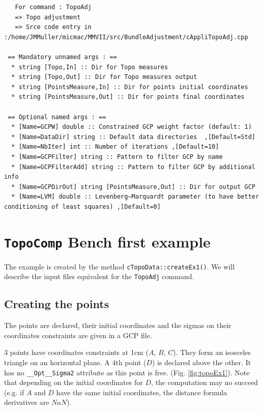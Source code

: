 \begin{verbatim}
   For command : TopoAdj 
   => Topo adjustment
   => Srce code entry in :/home/JMMuller/micmac/MMVII/src/BundleAdjustment/cAppliTopoAdj.cpp

 == Mandatory unnamed args : ==
  * string [Topo,In] :: Dir for Topo measures
  * string [Topo,Out] :: Dir for Topo measures output
  * string [PointsMeasure,In] :: Dir for points initial coordinates
  * string [PointsMeasure,Out] :: Dir for points final coordinates

 == Optional named args : ==
  * [Name=GCPW] double :: Constrained GCP weight factor (default: 1)
  * [Name=DataDir] string :: Default data directories  ,[Default=Std]
  * [Name=NbIter] int :: Number of iterations ,[Default=10]
  * [Name=GCPFilter] string :: Pattern to filter GCP by name
  * [Name=GCPFilterAdd] string :: Pattern to filter GCP by additional info
  * [Name=GCPDirOut] string [PointsMeasure,Out] :: Dir for output GCP
  * [Name=LVM] double :: Levenberg–Marquardt parameter (to have better conditioning of least squares) ,[Default=0]

\end{verbatim}



\section{\texttt{TopoComp} Bench first example}
\label{subsec:topoBench}

The example is created by the method \texttt{cTopoData::createEx1()}.
We will describe the input files equivalent for the \texttt{TopoAdj} command.


\subsection{Creating the points}

The points are declared, their initial coordinates and the sigmas on their coordinates constraints
are given in a GCP file. 

3 points have coordinates constraints at 1cm ($A$, $B$, $C$). They form an isosceles triangle
on an horizontal plane.
A 4th point ($D$) is declared above the other. It has no {\tt \_\_Opt\_\_Sigma2} attribute as this point is free.
(Fig. \ref{fig:topoEx1}). Note that depending on the initial coordinates for $D$, the computation may no succeed
(e.g. if $A$ and $D$ have the same initial coordinates, the distance formula derivatives are $NaN$).

